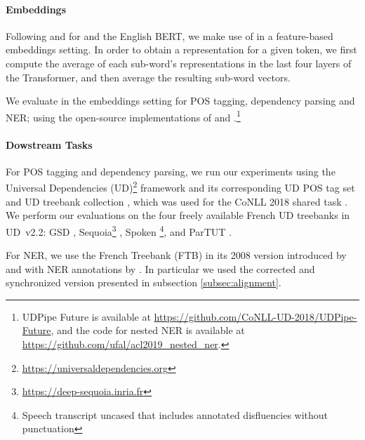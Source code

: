 \paragraph{Embeddings}

Following \citet{strakova-etal-2019-neural} and \citet{straka-strakova-2019-evaluating} for \mbert and the English BERT, we make use of \camembert in a feature-based embeddings setting. In order to obtain a representation for a given token, we first compute the average of each sub-word’s representations in the last four layers of the Transformer, and then average the resulting sub-word vectors.

We evaluate \camembert in the embeddings setting for POS tagging, dependency parsing and NER; using the open-source implementations of \citet{straka-strakova-2019-evaluating} and \citet{strakova-etal-2019-neural}.\footnote{UDPipe Future is available at \url{https://github.com/CoNLL-UD-2018/UDPipe-Future}, and the code for nested NER is available at \url{https://github.com/ufal/acl2019_nested_ner}.}


\paragraph{Dowstream Tasks}

For POS tagging and dependency parsing, we run our experiments using the Universal Dependencies (UD)\footnote{\url{https://universaldependencies.org}} framework and its corresponding UD POS tag set \citep{petrov-etal-2012-universal} and UD treebank collection \citep{nivre-etal-2018-universal}, which was used for the CoNLL 2018 shared task \citep{seker-etal-2018-universal}. We perform our evaluations on the four freely available French UD treebanks in UD~v2.2: GSD \citep{mcdonald-etal-2013-universal}, Sequoia\footnote{\url{https://deep-sequoia.inria.fr}} \citep{candito-seddah-2012-le,candito-etal-2014-deep}, Spoken \citep{lacheret-etal-2014-rhapsodie,bawden-etal-2014-correcting}\footnote{Speech transcript uncased that includes annotated disfluencies without punctuation}, and ParTUT \cite{sanguinetti-Bosco-2015-parttut}.

For NER, we use the French Treebank (FTB) \citep{abeille-etal-2003-building} in its 2008 version introduced by \citet{candito-crabbe-2009-improving} and with NER annotations by \citet{sagot-etal-2012-annotation}. In particular we used the corrected and synchronized version \citep{ortiz-suarez-etal-2020-establishing} presented in subsection \ref{subsec:alignment}.

